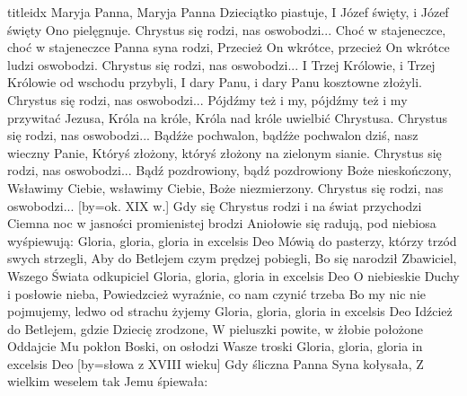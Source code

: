 \documentclass[a5paper, portrait, 12pt]{mwart}
\begin{document}
\begin{songs}{titleidx}
\beginverse
    Maryja Panna, Maryja Panna Dzieciątko piastuje,
    I Józef święty, i Józef święty Ono pielęgnuje.
\endverse 
\beginchorus
    Chrystus się rodzi, nas oswobodzi...
\endchorus
\beginverse
    Choć w stajeneczce, choć w stajeneczce Panna syna rodzi,
    Przecież On wkrótce, przecież On wkrótce ludzi oswobodzi.
\endverse 
\beginchorus
    Chrystus się rodzi, nas oswobodzi...
\endchorus
\beginverse
    I Trzej Królowie, i Trzej Królowie od wschodu przybyli,
    I dary Panu, i dary Panu kosztowne złożyli.
\endverse 
\beginchorus
    Chrystus się rodzi, nas oswobodzi...
\endchorus
\beginverse
    Pójdźmy też i my, pójdźmy też i my przywitać Jezusa,
    Króla na króle, Króla nad króle uwielbić Chrystusa.
\endverse 
\beginchorus
    Chrystus się rodzi, nas oswobodzi...
\endchorus
\beginverse
    Bądźże pochwalon, bądźże pochwalon dziś, nasz wieczny Panie,
    Któryś złożony, któryś złożony na zielonym sianie.
\endverse 
\beginchorus
    Chrystus się rodzi, nas oswobodzi...
\endchorus
\beginverse
    Bądź pozdrowiony, bądź pozdrowiony Boże nieskończony,
    Wsławimy Ciebie, wsławimy Ciebie, Boże niezmierzony.
\endverse 
\beginchorus
    Chrystus się rodzi, nas oswobodzi...
\endchorus
\endsong
[by={ok. XIX w.}]
\beginverse
    Gdy się Chrystus rodzi i na świat przychodzi
    Ciemna noc w jasności promienistej brodzi
    Aniołowie się radują, pod niebiosa wyśpiewują:
\endverse
\beginchorus
        Gloria, gloria, gloria in excelsis Deo
\endchorus
\beginverse
    Mówią do pasterzy, którzy trzód swych strzegli,
    Aby do Betlejem czym prędzej pobiegli,
    Bo się narodził Zbawiciel, Wszego Świata odkupiciel
\endverse
\beginchorus
        Gloria, gloria, gloria in excelsis Deo
\endchorus
\beginverse
    O niebieskie Duchy i posłowie nieba,
    Powiedzcież wyraźnie, co nam czynić trzeba
    Bo my nic nie pojmujemy, ledwo od strachu żyjemy
\endverse
\beginchorus
        Gloria, gloria, gloria in excelsis Deo
\endchorus
\beginverse
    Idźcież do Betlejem, gdzie Dziecię zrodzone,
    W pieluszki powite, w żłobie położone
    Oddajcie Mu pokłon Boski, on osłodzi Wasze troski
\endverse
\beginchorus
        Gloria, gloria, gloria in excelsis Deo
\endchorus
\endsong
[by={słowa z XVIII wieku}]
\beginverse
    Gdy śliczna Panna Syna kołysała,
    Z wielkim weselem tak Jemu śpiewała:


\end{songs}
\end{document}
